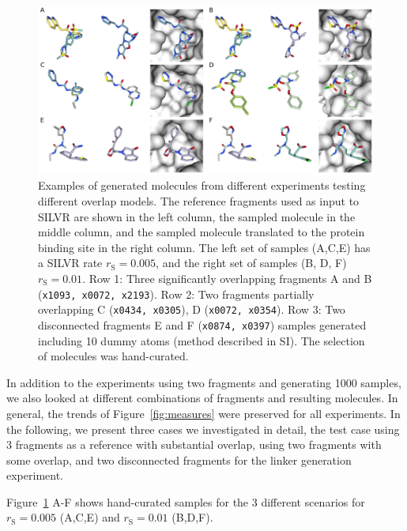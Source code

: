 \documentclass[journal=jacsat,manuscript=article]{achemso}
\begin{document}
\begin{figure}
    \centering
    \includegraphics[width=\textwidth]{paper/Figures/Fig4/fig_4_ref_sample_bound.png}
    \caption{Examples of generated molecules from different experiments testing different overlap models. The reference fragments used as input to SILVR  are shown in the left column, the sampled molecule in the middle column, and the sampled molecule translated to the protein binding site in the right column. The left set of samples (A,C,E) has a SILVR rate $r_{\mathrm{S}}=0.005$, and the right set of samples (B, D, F) $r_{\mathrm{S}}=0.01$. Row 1: Three significantly overlapping fragments A and B (\texttt{x1093, x0072, x2193}). Row 2: Two fragments partially overlapping C (\texttt{x0434, x0305}), D (\texttt{x0072, x0354}). Row 3: Two disconnected fragments E and F (\texttt{x0874, x0397}) samples generated including 10 dummy atoms (method described in SI). The selection of molecules was hand-curated.}
    \label{fig:samples}
\end{figure}

In addition to the experiments using two fragments and generating 1000 samples, we also looked at different combinations of fragments and resulting molecules. In general, the trends of Figure~\ref{fig:measures} were preserved for all experiments. In the following, we present three cases we investigated in detail, the test case using 3 fragments as a reference with substantial overlap, using two fragments with some overlap, and two disconnected fragments for the linker generation experiment. 

Figure~\ref{fig:samples} A-F shows hand-curated samples for the 3 different scenarios for $r_{\mathrm{S}}=0.005$ (A,C,E) and $r_{\mathrm{S}}=0.01$ (B,D,F).
\end{document}
